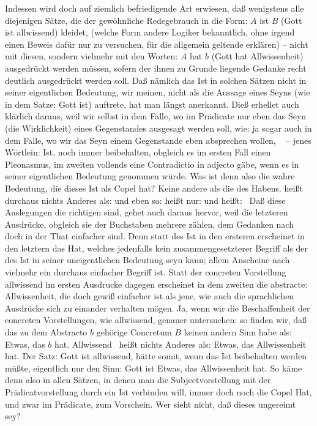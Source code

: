 Indessen wird doch auf ziemlich befriedigende Art erwiesen, daß wenigstens alle diejenigen Sätze, die der gewöhnliche Redegebrauch in die Form: $A$ ist $B$ (Gott ist allwissend) kleidet, (welche Form andere Logiker bekanntlich, ohne irgend  einen Beweis dafür nur zu versuchen, für die allgemein geltende erklären) -- nicht mit diesen, sondern vielmehr mit den Worten: $A$ hat $b$ (Gott hat Allwissenheit) ausgedrückt werden müssen, sofern der ihnen zu Grunde liegende Gedanke recht deutlich ausgedrückt werden soll. Daß nämlich das Ist in solchen Sätzen nicht in seiner eigentlichen Bedeutung, wir meinen, nicht als die Aussage eines Seyns (wie in dem Satze: Gott ist) auftrete, hat man längst anerkannt. Dieß erhellet auch klärlich daraus, weil wir selbst in dem Falle, wo im Prädicate nur eben das Seyn (die Wirklichkeit) eines Gegenstandes ausgesagt werden soll, wie:  ja sogar auch in dem Falle, wo wir das Seyn einem Gegenstande eben absprechen wollen, \zB\  -- jenes Wörtlein: Ist, noch immer beibehalten, obgleich es im ersten Fall einen Pleonasmus, im zweiten vollends eine Contradictio in adjecto gäbe, wenn es in seiner eigentlichen Bedeutung genommen würde. Was ist denn also die wahre Bedeutung, die dieses Ist als Copel hat? Keine andere als die des Habens.  heißt durchaus nichts Anderes als:  und eben so:  heißt nur:  und  heißt:  \usw\ Daß diese Auslegungen die richtigen sind, gehet auch daraus hervor, weil die letzteren Ausdrücke, obgleich sie der Buchstaben mehrere zählen, dem Gedanken nach doch in der That einfacher sind. Denn statt des Ist in den ersteren erscheinet in den letztern das Hat, welches jedenfalls kein zusammengesetzterer Begriff als der des Ist in seiner uneigentlichen Bedeutung seyn kann; allem Anscheine nach vielmehr ein durchaus einfacher Begriff ist. Statt der concreten Vorstellung allwissend im ersten Ausdrucke dagegen erscheinet in dem zweiten die abstracte: Allwissenheit, die doch gewiß einfacher ist als jene, wie auch die sprachlichen Ausdrücke sich zu einander verhalten mögen. Ja, wenn wir die Beschaffenheit der concreten Vorstellungen, wie allwissend, genauer untersuchen: so finden wir, daß das zu dem Abstracto $b$ gehörige Concretum $B$ keinen andern Sinn habe als: Etwas, das $b$ hat. Allwissend \zB\ heißt nichts Anderes als: Etwas, das Allwissenheit hat. Der Satz: Gott ist allwissend, hätte somit, wenn das Ist beibehalten werden müßte, eigentlich nur den Sinn: Gott ist Etwas, das Allwissenheit hat. So käme denn also in allen Sätzen, in denen man die Subjectvorstellung mit der Prädicatvorstellung durch ein Ist verbinden will, immer doch noch die Copel Hat, und zwar im Prädicate, zum Vorschein. Wer sieht nicht, daß dieses ungereimt sey? \par
